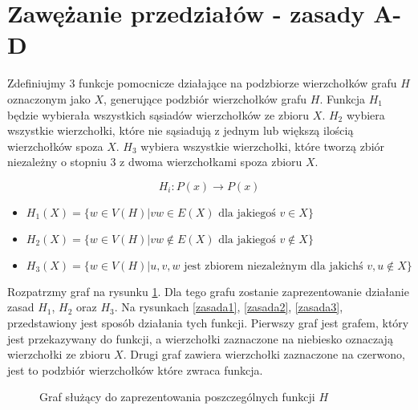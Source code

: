   

\section{Zawężanie przedziałów - zasady A-D}
Zdefiniujmy 3 funkcje pomocnicze działające na podzbiorze wierzchołków grafu $H$ oznaczonym jako $X$, generujące podzbiór wierzchołków grafu $H$. 
Funkcja $H_1$ będzie wybierała wszystkich sąsiadów wierzchołków ze zbioru $X$.
$H_2$ wybiera wszystkie wierzchołki, które nie sąsiadują z jednym lub większą ilością wierzchołków spoza $X$. 
$H_3$ wybiera wszystkie wierzchołki, które tworzą zbiór niezależny o stopniu 3 z dwoma wierzchołkami spoza zbioru $X$.

$$H_i: P(x) \to P(x)$$

\begin{itemize}
    
  \item   $H_1(X) = \{ w \in V(H) | vw \in E(X) \textrm{ dla jakiegoś } v \in X \}$ 
  
  \item   $H_2(X) = \{ w \in V(H) | vw \notin E(X) \textrm{ dla jakiegoś } v \notin X\}$
  
  \item   $H_3(X) = \{ w \in V(H) | { u, v, w } \textrm{ jest zbiorem niezależnym dla jakichś } v, u \notin X\}$ 
  \label{przedzialZaleznosc}
\end{itemize}


Rozpatrzmy graf na rysunku \ref{zasada0}. Dla tego grafu zostanie zaprezentowanie działanie zasad  $H_1$,  $H_2$ oraz  $H_3$. Na rysunkach \ref{zasada1}, \ref{zasada2}, \ref{zasada3}, przedstawiony jest sposób działania tych funkcji. Pierwszy graf jest grafem, który jest przekazywany do funkcji, a wierzchołki zaznaczone na niebiesko oznaczają wierzchołki ze zbioru $X$. Drugi graf zawiera wierzchołki zaznaczone na czerwono, jest to podzbiór wierzchołków które zwraca funkcja.


 \begin{figure}[H]
  \centering
    \caption{Graf służący do zaprezentowania poszczególnych funkcji $H$}
 \label{zasada0}
 \end{figure}

